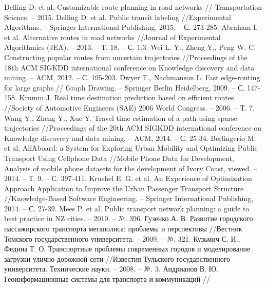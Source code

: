 \begin{thebibliography}{10}
     Delling D. et al. Customizable route planning in road networks //
        Transportation Science. -- 2015.
     Delling D. et al. Public transit labeling //Experimental Algorithms. -- 
        Springer International Publishing, 2015. -- С. 273-285.
     Abraham I. et al. Alternative routes in road networks //Journal of 
        Experimental Algorithmics (JEA). -- 2013. -- Т. 18. -- С. 1.3.
     Wei L. Y., Zheng Y., Peng W. C. Constructing popular routes from 
        uncertain trajectories //Proceedings of the 18th ACM SIGKDD international conference on 
        Knowledge discovery and data mining. -- ACM, 2012. -- С. 195-203.
     Dwyer T., Nachmanson L. Fast edge-routing for large graphs //
        Graph Drawing. -- Springer Berlin Heidelberg, 2009. -- С. 147-158.
     Krumm J. Real time destination prediction based on efficient routes //Society of 
        Automotive Engineers (SAE) 2006 World Congress. -- 2006. -- Т. 7.
     Wang Y., Zheng Y., Xue Y. Travel time estimation of a path using sparse 
        trajectories //Proceedings of the 20th ACM SIGKDD international conference on Knowledge 
        discovery and data mining. -- ACM, 2014. -- С. 25-34.
     Berlingerio M. et al. AllAboard: a System for Exploring Urban Mobility and 
        Optimizing Public Transport Using Cellphone Data //Mobile Phone Data for Development, Analysis 
        of mobile phone datasets for the development of Ivory Coast, 
        viewed. -- 2014. -- Т. 9. -- С. 397-411.
     Krushel E. G. et al. An Experience of Optimization Approach Application to Improve 
        the Urban Passenger Transport Structure //Knowledge-Based Software Engineering. -- Springer 
        International Publishing, 2014. -- С. 27-39.
     Mees P. et al. Public transport network planning: a guide to best practice in NZ 
        cities. -- 2010. -- №. 396.
     Гузенко А. В. Развитие городского пассажирского транспорта мегаполиса: проблемы 
        и перспективы //Вестник Томского государственного университета. -- 2009. -- №. 321.
     Кузьмич С. И., Федина Т. О. Транспортные проблемы современных городов и 
        моделирование загрузки улично-дорожной сети //Известия Тульского государственного 
        университета. Технические науки. -- 2008. -- №. 3.
     Андрианов В. Ю. Геоинформационные системы для транспорта и коммуникаций //

\end{thebibliography}
